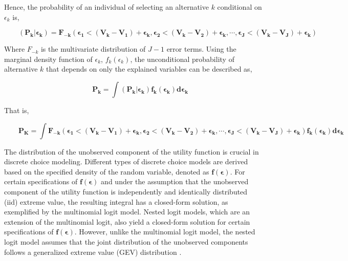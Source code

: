 \documentclass[a4paper,11pt]{article}
\begin{document}
    Hence, the probability of an individual of selecting an alternative $k$ conditional on $\epsilon_{k}$ is, 

    \begin{equation*}
        \qquad \mathbf{(P_{k}|\epsilon_{k}) = F_{-k}(\epsilon_{1} < (V_{k} - V_{1}) + \epsilon_{k},\epsilon_{2} < (V_{k} - V_{2}) + \epsilon_{k},\cdots,\epsilon_{J} < (V_{k} - V_{J}) + \epsilon_{k})}
    \end{equation*}

    Where $F_{-k}$ is the multivariate distribution of $J-1$ error terms. Using the marginal density function of $\epsilon_{k}$, $f_{k}(\epsilon_{k})$, the unconditional probability of alternative $k$ that depends on only the explained variables can be described as,

     \begin{equation*}
        \qquad \mathbf{P_{k} = \int(P_{k}|\epsilon_{k})f_{k}(\epsilon_{k})d\epsilon_{k}}
    \end{equation*}

    That is,

    \begin{equation*}
        \qquad \mathbf{P_{K} = \int F_{-k}(\epsilon_{1} < (V_{k} - V_{1}) + \epsilon_{k},\epsilon_{2} < (V_{k} - V_{2}) + \epsilon_{k},\cdots,\epsilon_{J} < (V_{k} - V_{J}) + \epsilon_{k})f_{k}(\epsilon_{k})d\epsilon_{k}}
    \end{equation*}
    \newpage    
    
    The distribution of the unobserved component of the utility function is crucial in discrete choice modeling. Different types of discrete choice models are derived based on the specified density of the random variable, denoted as $\mathbf{f(\epsilon)}$. For certain specifications of $\mathbf{f(\epsilon)}$ and under the assumption that the unobserved component of the utility function is independently and identically distributed (iid) extreme value, the resulting integral has a closed-form solution, as exemplified by the multinomial logit model. Nested logit models, which are an extension of the multinomial logit, also yield a closed-form solution for certain specifications of $\mathbf{f(\epsilon)}$. However, unlike the multinomial logit model, the nested logit model assumes that the joint distribution of the unobserved components follows a generalized extreme value (GEV) distribution \cite{Train}.\\
    
\end{document}
